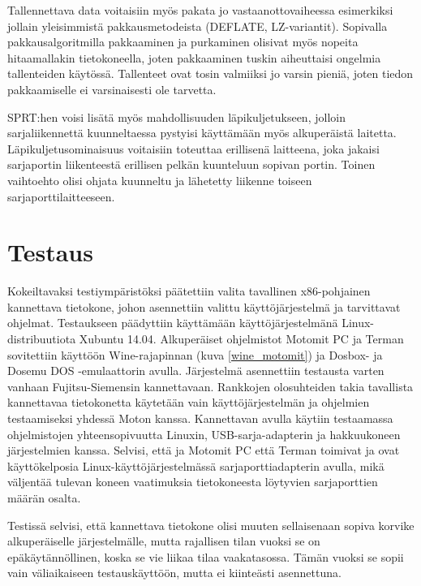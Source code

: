 Tallennettava data voitaisiin myös pakata jo vastaanottovaiheessa esimerkiksi jollain yleisimmistä pakkausmetodeista (DEFLATE, LZ-variantit). Sopivalla pakkausalgoritmilla pakkaaminen ja purkaminen olisivat myös nopeita hitaamallakin tietokoneella, joten pakkaaminen tuskin aiheuttaisi ongelmia tallenteiden käytössä. Tallenteet ovat tosin valmiiksi jo varsin pieniä, joten tiedon pakkaamiselle ei varsinaisesti ole tarvetta.

SPRT:hen voisi lisätä myös mahdollisuuden läpikuljetukseen, jolloin sarjaliikennettä kuunneltaessa pystyisi käyttämään myös alkuperäistä laitetta. Läpikuljetusominaisuus voitaisiin toteuttaa erillisenä laitteena, joka jakaisi sarjaportin liikenteestä erillisen pelkän kuunteluun sopivan portin. Toinen vaihtoehto olisi ohjata kuunneltu ja lähetetty liikenne toiseen sarjaporttilaitteeseen.

\section{Testaus}
Kokeiltavaksi testiympäristöksi päätettiin valita tavallinen x86-pohjainen kannettava tietokone, johon asennettiin valittu käyttöjärjestelmä ja tarvittavat ohjelmat. Testaukseen päädyttiin käyttämään käyttöjärjestelmänä Linux-distribuutiota Xubuntu 14.04. Alkuperäiset ohjelmistot Motomit PC ja Terman sovitettiin käyttöön Wine-rajapinnan (kuva \ref{wine_motomit}) ja Dosbox- ja Dosemu DOS -emulaattorin avulla. Järjestelmä asennettiin testausta varten vanhaan Fujitsu-Siemensin kannettavaan. Rankkojen olosuhteiden takia tavallista kannettavaa tietokonetta käytetään vain käyttöjärjestelmän ja ohjelmien testaamiseksi yhdessä Moton kanssa. Kannettavan avulla käytiin testaamassa ohjelmistojen yhteensopivuutta Linuxin, USB-sarja-adapterin ja hakkuukoneen järjestelmien kanssa. Selvisi, että ja Motomit PC että Terman toimivat ja ovat käyttökelposia Linux-käyttöjärjestelmässä sarjaporttiadapterin avulla, mikä väljentää tulevan koneen vaatimuksia tietokoneesta löytyvien sarjaporttien määrän osalta.

Testissä selvisi, että kannettava tietokone olisi muuten sellaisenaan sopiva korvike alkuperäiselle järjestelmälle, mutta rajallisen tilan vuoksi se on epäkäytännöllinen, koska se vie liikaa tilaa vaakatasossa. Tämän vuoksi se sopii vain väliaikaiseen testauskäyttöön, mutta ei kiinteästi asennettuna.


